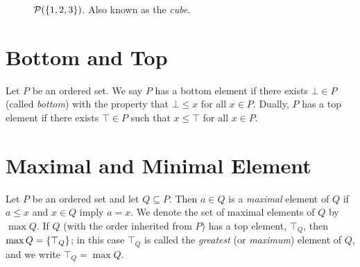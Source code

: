 \documentclass[../main-sheet.tex]{subfiles}
\begin{document}
\begin{figure}[H]
    \centering
    \caption{\(\mathcal{P}(\left\{1,2,3\right\})\). Also known as the \emph{cube}.}
\end{figure}
\section{Bottom and Top}
Let \(P\) be an ordered set. We say \(P\) has a bottom element if there exists \(\bot \in P\) (called \emph{bottom}) with the property that \(\bot \leq x\) for all \(x\in P\). Dually, \(P\) has a top element if there exists \(\top\in P\) such that \(x\leq \top\) for all \(x\in P\).
\section{Maximal and Minimal Element}
Let \(P\) be an ordered set and let \(Q\subseteq P\). Then \(a\in Q\) is a \emph{maximal } element of \(Q\) if \(a\leq x\) and \(x\in Q\) imply \(a=x\). We denote the set of maximal elements of \(Q\) by \(\max Q\). If \(Q\) (with the order inherited from \(P\)) has a top element, \(\top_Q\), then \(\max Q=\left\{\top_Q\right\}\); in this case \(\top_Q\) is called the \emph{greatest} (or \emph{maximum}) element of \(Q\), and we write \(\top_Q=\max Q\).
\end{document}
